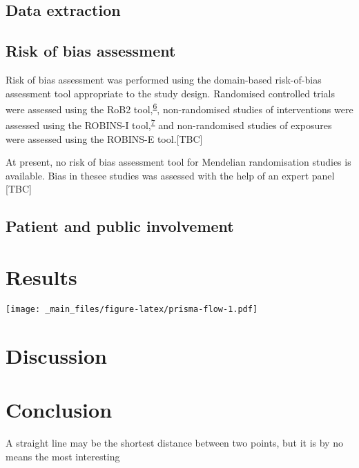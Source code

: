 \documentclass[a4paper, nobind]{templates/ociamthesis}
\begin{document}
\hypertarget{data-extraction}{%
\subsection{Data extraction}\label{data-extraction}}

\hypertarget{risk-of-bias-assessment}{%
\subsection{Risk of bias assessment}\label{risk-of-bias-assessment}}

Risk of bias assessment was performed using the domain-based risk-of-bias assessment tool appropriate to the study design. Randomised controlled trials were assessed using the RoB2 tool,\textsuperscript{\protect\hyperlink{ref-sterne2019}{6}}, non-randomised studies of interventions were assessed using the ROBINS-I tool,\textsuperscript{\protect\hyperlink{ref-sterne2016}{7}} and non-randomised studies of exposures were assessed using the ROBINS-E tool.{[}TBC{]}

At present, no risk of bias assessment tool for Mendelian randomisation studies is available. Bias in thesee studies was assessed with the help of an expert panel {[}TBC{]}

\hypertarget{patient-and-public-involvement}{%
\subsection{Patient and public involvement}\label{patient-and-public-involvement}}

\hypertarget{results}{%
\section{Results}\label{results}}

\texttt{[image: \_main\_files/figure-latex/prisma-flow-1.pdf]}

\hypertarget{discussion}{%
\section{Discussion}\label{discussion}}

\hypertarget{conclusion}{%
\section{Conclusion}\label{conclusion}}

\begin{savequote}
A straight line may be the shortest distance between two points, but it
is by no means the most interesting
\end{savequote}
\end{document}
